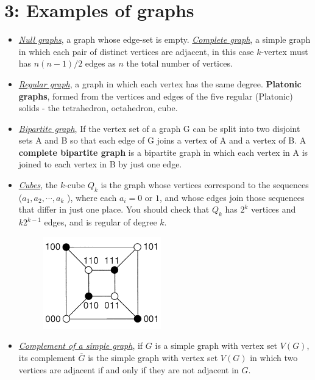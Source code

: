 \documentclass[12pt,a4paper, twocolumn]{article}
\begin{document}
\section*{3: Examples of graphs}
\begin{itemize}
	\item \underline{\emph{\color{magenta} Null graphs}}, a graph whose edge-set is empty. \underline{\emph{\color{magenta} Complete graph}}, a simple graph in which each pair of distinct vertices are adjacent, in this case $k$-vertex must has $n(n-1)/2$ edges as $n$ the total number of vertices.
	\item \underline{\emph{\color{magenta} Regular graph}}, a graph in which each vertex has the same degree. \textbf{Platonic graphs}, formed from the vertices and edges of the five regular (Platonic) solids - the tetrahedron, octahedron, cube.
	\item \underline{\emph{\color{magenta}Bipartite graph}}, If the vertex set of a graph G can be split into two disjoint sets A and B so that each edge of G joins a vertex of A and a vertex of B.  A \textbf{complete bipartite graph} is a bipartite graph in which each vertex in A is joined to each vertex in B by just one edge.
	\item \underline{\emph{\color{magenta} Cubes}}, the $k$-cube $Q_k$ is the graph whose vertices correspond to the sequences ($a_1, a_2, \cdots, a_k$ ), where each $a_i = 0 $ or $1$, and whose edges join those sequences that differ in just one place. You should check that $Q_k$ has $2^{k}$ vertices and $k 2^{k-1}$ edges, and is regular of degree $k$.\\
	\begin{figure}[h!]
	\centering
	\includegraphics[scale=0.7]{figures/cube1.png}
	\end{figure}
	\item \underline{\emph{\color{magenta}Complement of a simple graph}}, if $G$ is a simple graph with vertex set $V(G)$, its complement $\overline{G}$ is the simple graph with vertex set $V(G)$ in which two vertices are adjacent if and only if they are not adjacent in $G$.
\end{itemize}
\vfill
\end{document}
